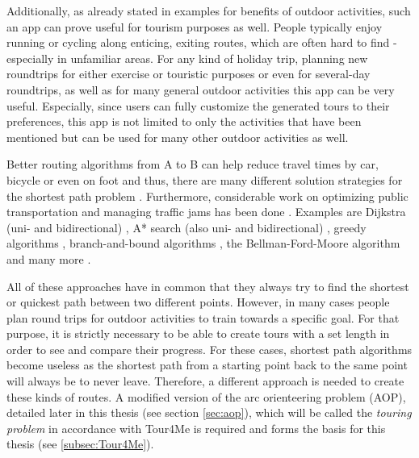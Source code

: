 Additionally, as already stated in examples for benefits of outdoor activities, such an app can prove useful for tourism purposes as well. 
People typically enjoy running or cycling along enticing, exiting routes, which are often hard to find - especially in unfamiliar areas.
For any kind of holiday trip, planning new roundtrips for either exercise or touristic purposes or even for several-day roundtrips, as well as for many general outdoor activities this app can be very useful.
Especially, since users can fully customize the generated tours to their preferences, this app is not limited to only the activities that have been mentioned but can be used for many other outdoor activities as well.


Better routing algorithms from A to B can help reduce travel times by car, bicycle or even on foot and thus, there are many different solution strategies for the shortest path problem \cite{cherkassky_shortest_1996, deo_shortest-path_1984, gallo_shortest_1988, madkour_survey_2017, sommer_shortest-path_2014, wayahdi_greedy_2021}.
Furthermore, considerable work on optimizing public transportation \cite{bast_route_2016, delling_round-based_2015} and managing traffic jams has been done \cite{delling_time-dependent_2011, delling_customizable_2017}. 
Examples are Dijkstra (uni- and bidirectional) \cite{madkour_survey_2017, sommer_shortest-path_2014, wayahdi_greedy_2021}, A* search (also uni- and bidirectional) \cite{madkour_survey_2017, sommer_shortest-path_2014, wayahdi_greedy_2021}, greedy algorithms \cite{madkour_survey_2017, wayahdi_greedy_2021}, branch-and-bound algorithms \cite{lawler_branch-and-bound_1966}, the Bellman-Ford-Moore algorithm \cite{cherkassky_shortest_1996} and many more \cite{delling_engineering_2009, gallo_shortest_1988, sommer_shortest-path_2014}.

All of these approaches have in common that they always try to find the shortest or quickest path between two different points.
However, in many cases people plan round trips for outdoor activities to train towards a specific goal.
For that purpose, it is strictly necessary to be able to create tours with a set length in order to see and compare their progress.
For these cases, shortest path algorithms become useless as the shortest path from a starting point back to the same point will always be to never leave. 
Therefore, a different approach is needed to create these kinds of routes.
A modified version of the arc orienteering problem (AOP), detailed later in this thesis (see section \ref{sec:aop}), which will be called the \textit{touring problem} in accordance with Tour4Me \cite{buchin_tour4me_2022} is required and forms the basis for this thesis (see \ref{subsec:Tour4Me}).


